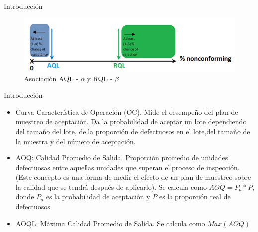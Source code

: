 \documentclass[10pt]{beamer}
\begin{document}
\begin{frame}{Introducción}
\begin{figure}[h!]
  \centering
  \includegraphics[scale=0.7]{FigurasUV/AQLRQL.png}
  \caption{Asociación AQL - $\alpha$ y RQL - $\beta$}
\end{figure}
\end{frame}



\begin{frame}{Introducción}
\begin{itemize}
\justifying
\item Curva Característica de Operación (OC). Mide el desempeño del plan de muestreo de aceptación. Da la probabilidad de aceptar un lote dependiendo del tamaño del lote, de la proporción de defectuosos en el lote,del tamaño de la muestra y del número de aceptación.
\item AOQ: Calidad Promedio de Salida. Proporción promedio de unidades defectuosas entre aquellas unidades que superan el proceso de inspección. (Este concepto es una forma de medir el efecto de un plan de muestreo sobre la calidad que se tendrá después de aplicarlo). Se calcula como $AOQ=P_a*P$, donde $P_a$ es la probabilidad de aceptación y $P$ es la proporción real de defectuosos.
\item AOQL: Máxima Calidad Promedio de Salida. Se calcula como $Max(AOQ)$
\end{itemize}
\end{frame}
\end{document}
